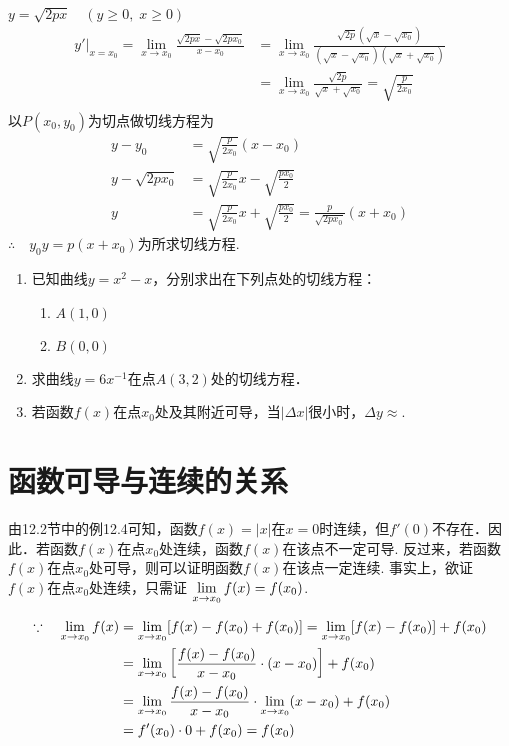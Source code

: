 \begin{solution}
$y=\sqrt{2px}\quad (y\ge 0,\; x\ge 0)$
\[\begin{split}
    y' \Big|_{x=x_{0}}=\lim_{x\to x_{0}}\frac{\sqrt{2px}-\sqrt{2px_{0}}}{x-x_{0}}&=\lim_{x\to x_{0}}\frac{\sqrt{2p}(\sqrt{x}-\sqrt{x_{0}})}{(\sqrt{x}-\sqrt{x_{0}})(\sqrt{x}+\sqrt{x_{0}})}\\
    &=\lim_{x\to x_{0}}\frac{\sqrt{2p}}{\sqrt{x}+\sqrt{x_{0}}}=\sqrt{\frac{p}{2x_{0}}}\\
\end{split}\]
以$P(x_0,y_0)$为切点做切线方程为
\[\begin{split}
    y-y_0&=\sqrt{\frac{p}{2x_0}}(x-x_0)\\
    y-\sqrt{2px_0}&=\sqrt{\frac{p}{2x_0}}x-\sqrt{\frac{px_0}{2}}\\
y&=\sqrt{\frac p{2x_{0}}}x+\sqrt{\frac{px_{0}}2}=\frac{p}{\sqrt{2px_{0}}}(x+x_{0})
\end{split}\]
$\therefore\quad y_{0}y= p( x+ x_{0})$为所求切线方程.
\end{solution}

\begin{ex}
\begin{enumerate}
    \item 已知曲线$y=x^2-x$，分别求出在下列点处的切线方程：
\begin{multicols}{2}
\begin{enumerate}[(1)]
    \item $A(1,0)$
    \item $B(0,0)$
\end{enumerate}
\end{multicols}
    \item 求曲线$y=6x^{-1}$在点$A(3,2)$处的切线方程．
    \item 若函数$f(x)$在点$x_0$处及其附近可导，当$|\Delta x|$很小时，$\Delta y\approx$\blank .
\end{enumerate}
\end{ex}

\section{函数可导与连续的关系}
由12.2节中的例12.4可知，函数$f(x)=|x|$在$x=0$时连续，但$f'(0)$不存在．因此．若函数$f(x)$在点$x_0$处连续，函数$f(x)$在该点不一定可导. 反过来，若函数$f(x)$在点$x_0$处可导，则可以证明函数$f(x)$在该点一定连续. 事实上，欲证$f(x)$在点$x_0$处连续，只需证
$\lim\limits_{x\to x_0}f(x)=f(x_0)$.

\[\begin{split}
\because\quad \lim\limits_{x\to x_0}f(x)&=\lim\limits_{x\to x_0}[f(x)-f(x_0)+f(x_0)]=\lim\limits_{x\to x_0}[f(x)-f(x_0)]+f(x_0)\\
&=\lim\limits_{x\to x_0}\left[\dfrac{f(x)-f(x_0)}{x-x_0}\cdot (x-x_0)\right]+f(x_0)\\
&=\lim\limits_{x\to x_0} \dfrac{f(x)-f(x_0)}{x-x_0}  \cdot \lim\limits_{x\to x_0}(x-x_0)+f(x_0)\\
&=f'(x_0)\cdot 0+f(x_0) =f(x_0)
\end{split}\]

